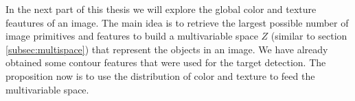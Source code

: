 
In the next part of this thesis we will explore the global color and texture feautures of an image. The main idea is to retrieve the largest possible number of image primitives and features to build a multivariable space $Z$ (similar to section \ref{subsec:multispace}) that represent the objects in an image. We have already obtained some contour features that were used for the target detection. The proposition now is to use the distribution of color and texture to feed the multivariable space. 


